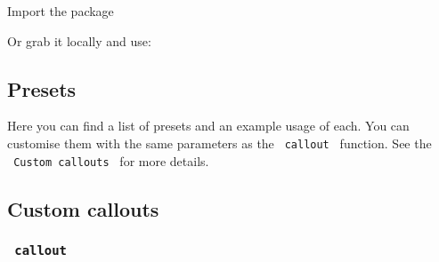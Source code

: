 Import the package

\begin{Shaded}
\begin{Highlighting}[]
\end{Highlighting}
\end{Shaded}

Or grab it locally and use:

\begin{Shaded}
\begin{Highlighting}[]
\end{Highlighting}
\end{Shaded}

\subsection{Presets}\label{presets}

Here you can find a list of presets and an example usage of each. You
can customise them with the same parameters as the \texttt{\ callout\ }
function. See the \texttt{\ Custom\ callouts\ } for more details.

\begin{Shaded}
\begin{Highlighting}[]







\end{Highlighting}
\end{Shaded}

\subsection{Custom callouts}\label{custom-callouts}

\subsubsection{\texorpdfstring{\texttt{\ callout\ }}{ callout }}\label{callout}

